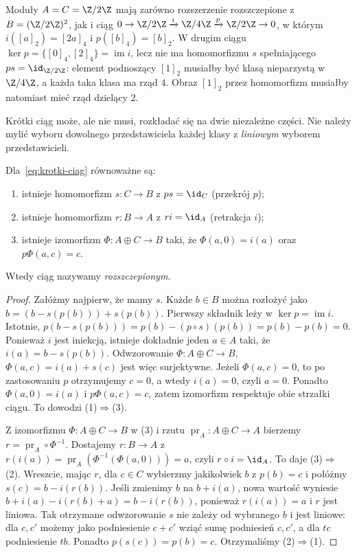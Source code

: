 \begin{przyklad}
\label{prz:ses-dwa-rozszerzenia}
Moduły $A=C=\Z/2\Z$ mają zarówno rozszerzenie
rozszczepione z $B=(\Z/2\Z)^2$, jak i ciąg
$0\to\Z/2\Z\xrightarrow{i}\Z/4\Z
\xrightarrow{p}\Z/2\Z\to0$, w którym
$i([a]_2)=[2a]_4$ i $p([b]_4)=[b]_2$.
W drugim ciągu $\ker p=\{[0]_4,[2]_4\}
=\operatorname{im}i$, lecz nie ma homomorfizmu
$s$ spełniającego $ps=\id_{\Z/2\Z}$:
element podnoszący $[1]_2$ musiałby być klasą
nieparzystą w $\Z/4\Z$, a każda taka klasa ma
rząd $4$. Obraz $[1]_2$ przez homomorfizm
musiałby natomiast mieć rząd dzielący $2$.
\end{przyklad}

Krótki ciąg może, ale nie musi, rozkładać się
na dwie niezależne części. Nie należy mylić
wyboru dowolnego przedstawiciela każdej klasy
z \emph{liniowym} wyborem przedstawicieli.

\begin{twierdzenie}
\label{thm:ses-rozszczepienie}
Dla~\eqref{eq:krotki-ciag} równoważne są:
\begin{enumerate}[leftmargin=*]
\item istnieje homomorfizm $s:C\to B$
      z $p s=\id_C$ (przekrój $p$);
\item istnieje homomorfizm $r:B\to A$
      z $r i=\id_A$ (retrakcja $i$);
\item istnieje izomorfizm $\Phi:A\oplus C\to B$
      taki, że $\Phi(a,0)=i(a)$ oraz
      $p\Phi(a,c)=c$.
\end{enumerate}
Wtedy ciąg nazywamy \emph{rozszczepionym}.
\end{twierdzenie}
\begin{proof}
Załóżmy najpierw, że mamy $s$.
Każde $b\in B$ można rozłożyć jako
$b=(b-s(p(b)))+s(p(b))$.
Pierwszy składnik leży w $\ker p=\operatorname{im}i$.
Istotnie, $p(b-s(p(b)))=p(b)-(p\circ s)(p(b))=p(b)-p(b)=0$.
Ponieważ $i$ jest iniekcją, istnieje dokładnie
jeden $a\in A$ taki, że $i(a)=b-s(p(b))$.
Odwzorowanie
$\Phi:A\oplus C\to B$, $\Phi(a,c)=i(a)+s(c)$
jest więc surjektywne. Jeżeli $\Phi(a,c)=0$,
to po zastosowaniu $p$ otrzymujemy $c=0$,
a wtedy $i(a)=0$, czyli $a=0$.
Ponadto $\Phi(a,0)=i(a)$ i $p\Phi(a,c)=c$,
zatem izomorfizm respektuje obie strzałki ciągu.
To dowodzi (1)$\Rightarrow$(3).

Z izomorfizmu $\Phi:A\oplus C\to B$ w (3) i rzutu
$\operatorname{pr}_A:A\oplus C\to A$ bierzemy
$r=\operatorname{pr}_A\circ\Phi^{-1}$. Dostajemy
$r:B\to A$ z $r(i(a))=\operatorname{pr}_A(\Phi^{-1}(\Phi(a,0)))=a$,
czyli $r\circ i=\id_A$. To daje (3)$\Rightarrow$(2).
Wreszcie, mając $r$, dla $c\in C$ wybierzmy
jakikolwiek $b$ z $p(b)=c$ i połóżmy
$s(c)=b-i(r(b))$. Jeśli zmienimy $b$ na
$b+i(a)$, nowa wartość wyniesie
$b+i(a)-i(r(b)+a)=b-i(r(b))$,
ponieważ $r(i(a))=a$ i $r$ jest liniowa.
Tak otrzymane odwzorowanie $s$ nie zależy od
wybranego $b$ i jest liniowe: dla $c,c'$
możemy jako podniesienie $c+c'$ wziąć sumę
podniesień $c,c'$, a dla $tc$ podniesienie $tb$.
Ponadto $p(s(c))=p(b)=c$.
Otrzymaliśmy (2)$\Rightarrow$(1).
\end{proof}


